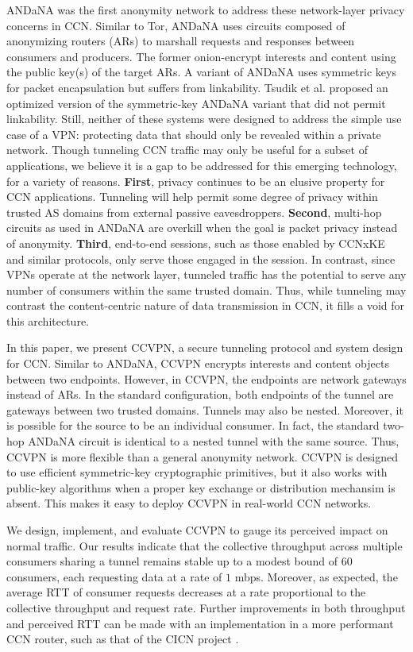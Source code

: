 ANDaNA \cite{dibenedetto2011andana} was the first anonymity network to address these
network-layer privacy concerns in CCN.
Similar to Tor, ANDaNA uses circuits composed of anonymizing routers (ARs)
to marshall requests and responses between consumers and producers. The former
onion-encrypt interests and content using the public key(s) of the target ARs.
A variant of ANDaNA uses symmetric keys for packet encapsulation but suffers from
linkability. Tsudik et al. \cite{tsudik2016ac3n} proposed an optimized version of
the symmetric-key ANDaNA variant that did not permit linkability. Still, neither of
these systems were designed to address the simple use case of a VPN: protecting
data that should only be revealed within a private network. Though tunneling CCN
traffic may only be useful for a subset of applications, we believe it is a gap to be addressed
for this emerging technology, for a variety of reasons. {\bf First}, privacy
continues to be an elusive property for CCN applications. Tunneling will help
permit some degree of privacy within trusted AS domains from external passive
eavesdroppers. {\bf Second}, multi-hop circuits as used in ANDaNA are overkill
when the goal is packet privacy instead of anonymity. {\bf Third}, end-to-end
sessions, such as those enabled by CCNxKE \cite{ccnxke} and similar protocols,
only serve those engaged in the session. In contrast, since VPNs operate at the
network layer, tunneled traffic has the potential to serve any number of consumers
within the same trusted domain. Thus, while tunneling may contrast the content-centric
nature of data transmission in CCN, it fills a void for this architecture.

In this paper, we present CCVPN, a secure tunneling protocol and system design for
CCN. Similar to ANDaNA, CCVPN encrypts interests and content objects between two endpoints.
However, in CCVPN, the endpoints are network gateways instead of ARs. In the standard configuration, both
endpoints of the tunnel are gateways between two trusted domains. Tunnels may
also be nested. Moreover, it is possible for the source to be an individual consumer.
In fact, the standard two-hop ANDaNA circuit is identical to a nested tunnel
with the same source. Thus, CCVPN is more flexible than a general anonymity network.
CCVPN is designed to use efficient symmetric-key cryptographic primitives, but it also
works with public-key algorithms when a proper key exchange or distribution mechansim
is absent. This makes it easy to deploy CCVPN in real-world CCN networks.

We design, implement, and evaluate CCVPN to gauge its perceived impact on normal
traffic. Our results indicate that the collective throughput across multiple
consumers sharing a tunnel remains stable up to a modest bound of $60$ consumers, each
requesting data at a rate of $1$ mbps. Moreover, as expected, the average RTT of
consumer requests decreases at a rate proportional to the collective throughput
and request rate. Further improvements in both throughput and perceived RTT
can be made with an implementation in a more performant CCN router, such as that of the CICN
project \cite{cicn}.

